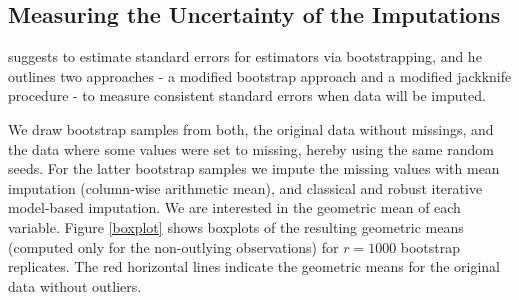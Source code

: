 \documentclass{scrartcl}\usepackage[]{graphicx}\usepackage[]{color}
\makeatletter
\newenvironment{kframe}{%
 \def\at@end@of@kframe{}%
 \ifinner\ifhmode%
  \def\at@end@of@kframe{\end{minipage}}%
  \begin{minipage}{\columnwidth}%
 \fi\fi%
 \def\FrameCommand##1{\hskip\@totalleftmargin \hskip-\fboxsep
 \colorbox{shadecolor}{##1}\hskip-\fboxsep
     \hskip-\linewidth \hskip-\@totalleftmargin \hskip\columnwidth}%
 \MakeFramed {\advance\hsize-\width
   \@totalleftmargin\z@ \linewidth\hsize
   \@setminipage}}%
 {\par\unskip\endMakeFramed%
 \at@end@of@kframe}
\newenvironment{knitrout}{}{} %
\makeatother
\begin{document}
\begin{knitrout}
\color{fgcolor}\begin{kframe}


{\ttfamily\noindent\bfseries\color{errorcolor}{\#\# Error in constSum(xImp1\$xImp[1:95, ]): object 'xImp1' not found}}

{\ttfamily\noindent\bfseries\color{errorcolor}{\#\# Error in constSum(xImp2\$xImp[1:95, ]): object 'xImp2' not found}}

{\ttfamily\noindent\bfseries\color{errorcolor}{\#\# Error in eval(expr, envir, enclos): object 'v2' not found}}

{\ttfamily\noindent\bfseries\color{errorcolor}{\#\# Error in eval(expr, envir, enclos): object 'v22' not found}}\end{kframe}
\end{knitrout}

\begin{knitrout}
\color{fgcolor}\begin{kframe}


{\ttfamily\noindent\bfseries\color{errorcolor}{\#\# Error: object 'xImp1' not found}}

{\ttfamily\noindent\bfseries\color{errorcolor}{\#\# Error: object 'xImp2' not found}}

{\ttfamily\noindent\bfseries{}}

{\ttfamily\noindent\bfseries{}}\end{kframe}
\end{knitrout}

\subsection{Measuring the Uncertainty of the Imputations}

\cite{Little87} suggests to estimate standard errors for estimators via bootstrapping,
and he outlines two approaches - a modified bootstrap approach and 
a modified jackknife procedure - to measure consistent 
standard errors when data will be imputed.

We draw bootstrap samples from both, the original data without missings,
and the data where some values were set to missing, hereby using the same
random seeds.
For the latter bootstrap samples we impute the missing values
with mean imputation (column-wise arithmetic mean), and classical and
robust iterative model-based imputation.
We are interested in the geometric mean of each variable.
Figure \ref{boxplot} shows boxplots of the resulting geometric means
(computed only for the non-outlying observations)
for $r=1000$ bootstrap replicates.
The red horizontal lines indicate the geometric means for the original data
without outliers.
\end{document}
